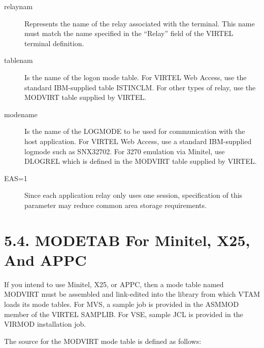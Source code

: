 \documentclass[letterpaper,10pt,english]{sphinxmanual}
\begin{document}
\begin{sphinxVerbatim}[commandchars=\\\{\}]
  
\end{sphinxVerbatim}
\begin{description}
\item[{relaynam}] \leavevmode
Represents the name of the relay associated with the terminal. This name must match the name specified in the “Relay” field of the
VIRTEL terminal definition.

\item[{tablenam}] \leavevmode
Is the name of the logon mode table. For VIRTEL Web Access, use the standard IBM-supplied table ISTINCLM. For other types of relay, use the MODVIRT table supplied by VIRTEL.

\item[{modename}] \leavevmode
Is the name of the LOGMODE to be used for communication with the host application. For VIRTEL Web Access, use a standard IBM-supplied
logmode such as SNX32702. For 3270 emulation via Minitel, use DLOGREL which is defined in the MODVIRT table supplied by VIRTEL.

\item[{EAS=1}] \leavevmode
Since each application relay only uses one session, specification of this parameter may reduce common area storage requirements.

\end{description}


\section{5.4. MODETAB For Minitel, X25, And APPC}
\label{\detokenize{Installation_Guide:modetab-for-minitel-x25-and-appc}}
If you intend to use Minitel, X25, or APPC, then a mode table named MODVIRT must be assembled and link-edited into the library from which VTAM loads its mode tables. For MVS, a sample job is provided     in the ASMMOD member of the VIRTEL SAMPLIB. For VSE, sample JCL is provided in the VIRMOD installation job.

The source for the MODVIRT mode table is defined as follows:
\end{document}
